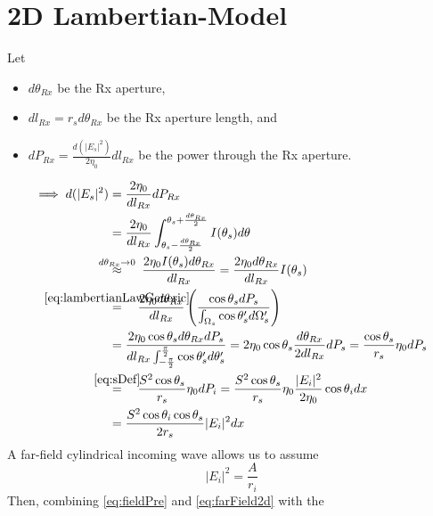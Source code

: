 \documentclass{article}
\begin{document}
\renewcommand{\thesection}{\arabic{section}}
\setcounter{section}{0}
\setcounter{equation}{0}
\newpage
\section{2D Lambertian-Model}
Let 
\begin{itemize}
   \item $d \theta_{Rx}$ be the Rx aperture,
   \item $d l_{Rx} = r_s d \theta_{Rx}$ be the Rx aperture length, and
   \item $d P_{Rx} = \frac{d(|E_s|^2)}{2 \eta_0} dl_{Rx}$ be the power through the Rx
      aperture.
\end{itemize}
\begin{align}
   \implies d(|E_s|^2) &= \frac{2 \eta_0 }{dl_{Rx}} dP_{Rx} \nonumber \\
   &= \frac{2 \eta_0 }{dl_{Rx}} \int_{\theta_{s} - \frac{d
      \theta_{Rx}}{2}}^{\theta_{s} + \frac{d \theta_{Rx}}{2}} I( \theta_s ) d \theta
      \nonumber \\
   &\overset{\mathclap{d \theta_{Rx} \to 0}}{\approx} \ \ \ \ \frac{2 \eta_0 I(\theta_s) d
      \theta_{Rx}}{dl_{Rx}} = \frac{2 \eta_0 d \theta_{Rx}}{dl_{Rx}} I(\theta_s) \nonumber \\
   &\overset{\mathclap{\eqref{eq:lambertianLawGeneric}}}{=} \ \ \ \frac{2 \eta_0
      d \theta_{Rx}}{dl_{Rx}} \left( \frac{\cos \theta_s dP_s}{ \int_{\Omega_s} \cos
      \theta_s' d \Omega_s' } \right) \nonumber \\ 
   &= \frac{2 \eta_0 \cos \theta_s d \theta_{Rx} d P_s}{dl_{Rx}
      \int_{-\frac{\pi}{2}}^{\frac{\pi}{2}} \cos \theta_s' d \theta_s'} = 2 \eta_0 
      \cos \theta_{s} \frac{ d \theta_{Rx} }{2 dl_{Rx} } d P_s = \frac{\cos
      \theta_s}{r_s} \eta_0 dP_s \nonumber \\
   &\overset{\mathclap{\eqref{eq:sDef}}}{=} \ \ \ \frac{S^2 \cos \theta_s}{r_s}
      \eta_0 dP_i = \frac{S^2 \cos \theta_s}{r_s} \eta_0\frac{|E_i|^2}{2 \eta_0} \cos
      \theta_i dx \nonumber \\ 
   &= \frac{S^2 \cos \theta_i \cos \theta_s}{2r_s} |E_i|^2 dx
   \label{eq:fieldPre}
\end{align}
A far-field cylindrical incoming wave allows us to assume 
\begin{equation}
   |E_i|^2 = \frac{A}{r_i}
   \label{eq:farField2d}
\end{equation}
Then, combining \eqref{eq:fieldPre} and \eqref{eq:farField2d} with the
\end{document}
